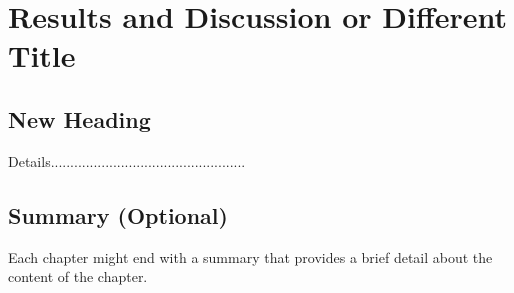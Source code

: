 \chapter{Results and Discussion or Different Title}

    


\section{New Heading}
\begin{justify}
    Details..................................................
\end{justify}


\section{Summary (Optional)}
\begin{justify}
    Each chapter might end with a summary that provides a brief detail about the content of the chapter.
\end{justify}


\clearpage